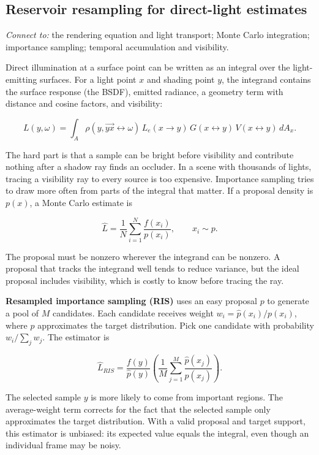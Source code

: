 \subsection{Reservoir resampling for direct-light estimates}\label{03-visual-computing-i-ch012-reservoir-resampling-for-direct-light-estimates}

\hypertarget{03-visual-computing-i-ch012-reservoir-resampling-for-direct-light-estimates}{}

\emph{Connect to:} the rendering equation and light transport; Monte Carlo integration; importance sampling; temporal accumulation and visibility.

Direct illumination at a surface point can be written as an integral over the light-emitting surfaces. For a light point \(x\) and shading point \(y\), the integrand contains the surface response (the BSDF), emitted radiance, a geometry term with distance and cosine factors, and visibility:

\[L(y,\omega)=\int_A \rho(y,\overrightarrow{yx}\leftrightarrow\omega)\,L_e(x\to y)\,G(x\leftrightarrow y)\,V(x\leftrightarrow y)\,dA_x.\]

The hard part is that a sample can be bright before visibility and contribute nothing after a shadow ray finds an occluder. In a scene with thousands of lights, tracing a visibility ray to every source is too expensive. Importance sampling tries to draw more often from parts of the integral that matter. If a proposal density is \(p(x)\), a Monte Carlo estimate is

\[\widehat L=\frac{1}{N}\sum_{i=1}^N\frac{f(x_i)}{p(x_i)},\qquad x_i\sim p.\]

The proposal must be nonzero wherever the integrand can be nonzero. A proposal that tracks the integrand well tends to reduce variance, but the ideal proposal includes visibility, which is costly to know before tracing the ray.

\textbf{Resampled importance sampling (RIS)} uses an easy proposal \(p\) to generate a pool of \(M\) candidates. Each candidate receives weight \(w_i=\widehat p(x_i)/p(x_i)\), where \(\widehat p\) approximates the target distribution. Pick one candidate with probability \(w_i/\sum_jw_j\). The estimator is

\[\widehat L_{RIS}=\frac{f(y)}{\widehat p(y)}\left(\frac{1}{M}\sum_{j=1}^M\frac{\widehat p(x_j)}{p(x_j)}\right).\]

The selected sample \(y\) is more likely to come from important regions. The average-weight term corrects for the fact that the selected sample only approximates the target distribution. With a valid proposal and target support, this estimator is unbiased: its expected value equals the integral, even though an individual frame may be noisy.

